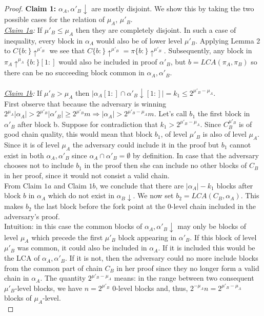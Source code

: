 \begin{proof}
	\textbf{Claim 1:} $\alpha_A, \alpha'_B\downarrow$ are mostly disjoint. We show
	this by taking the two possible cases for the relation of $\mu_A$, $\mu'_B$.\\
	\textit{\underline{Claim 1a}:} If $\mu'_B \leq \mu_A$ then they are completely
	disjoint. In such a case of inequality, every block in $\alpha_A$ would also be
	of lower level $\mu'_B$. Applying Lemma 2 to $C\{b:\}\uparrow^{\mu'_B}$  we see
	that $C\{b:\}\uparrow^{\mu'_B} = \pi\{b:\}\uparrow^{\mu'_B}$. Subsequently, any
	block in $\pi_A\uparrow^{\mu_A}\{b:\}[1:]$ would also be included in proof
	$\alpha'_B$, but $b=LCA(\pi_A, \pi_B)$ so there can be no succeeding block
	common in $\alpha_A, \alpha'_B$. \\
	\\
	\textit{\underline{Claim 1b}:} If  $\mu'_B > \mu_A$ then $\vert \alpha_A[1:] 
	\cap \alpha'_B\downarrow[1:] \vert = k_1 \leq 2^{\mu'_B - \mu_A}$.\\
	First observe that because the adversary is winning $2^{\mu_A} \vert \alpha_A \vert 
	> 2^{\mu'_B} \vert \alpha'_B \vert \geq 2^{\mu'_B} m \Rightarrow \vert \alpha_A \vert 
	> 2^{\mu'_B - \mu_A}m$.
	Let's call $b_1$ the first block in $\alpha'_B$ after block b.
	Suppose for contradiction that $k_1 > 2^{\mu'_B - \mu_A}$.  Since $C_B^{\mu'_B}$ is
	of good chain quality, this would mean that block $b_1$, of level $\mu'_B$ is also
	of level $\mu_A$. Since it is of level $\mu_A$ the adversary could include it in
	the proof but $b_1$ cannot exist in both $\alpha_A, \alpha'_B$ since $\alpha_A
	\cap \alpha'_B = \emptyset$ by definition. In case that the adversary chooses not
	to include $b_1$ in the proof then she can include no other blocks of $C_B$ in
	her proof, since it would not consist a valid chain.  \\


	From Claim $1a$ and Claim $1b$, we conclude that there are $\vert \alpha_A
	\vert - k_1$ blocks after block $b$ in $\alpha_A$ which do not exist in
	$\alpha_B\downarrow$. We now set $b_2 = LCA(C_B, \alpha_A)$. This makes $b_2$
	the last block before the fork point at the 0-level chain included in the adversary's proof.\\

	Intuition: in this case the common blocks of $\alpha_A, \alpha'_B\downarrow$
	may only be blocks of level $\mu_A$ which precede the first $\mu'_B$ block
	appearing in $\alpha'_B$. If this block of level $\mu'_B$ was common, it could
	also be included in $\alpha_A$. If it is included this would be the LCA of
	$\alpha_A, \alpha'_B$. If it is not, then the adversary could no more include
	blocks from the common part of chain $C_B$ in her proof since they no longer
	form a valid chain in $\alpha_A$. The quantity $2^{\mu'_B - \mu_A}$ means: in
	the range between two consequent $\mu'_B$-level blocks, we have $n = 2^{\mu'_B}$
	0-level blocks and, thus, $2^{-\mu_A}n = 2^{\mu'_B - \mu_A}$ blocks of $\mu_A$-level. \\


\end{proof}

